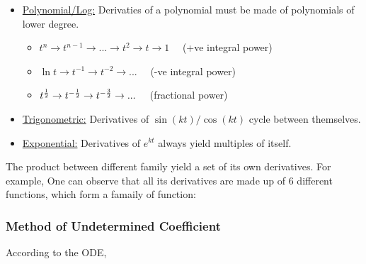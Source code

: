 \documentclass[class=article, crop=false, 12pt]{standalone}
\begin{document}
\begin{itemize}
    \item \ul{Polynomial/Log:} Derivaties of a polynomial must be made of polynomials of lower degree.
    \begin{itemize}
        \item $t^n \to t^{n-1} \to ...\to t^2 \to t \to 1 \quad$ (+ve integral power)
        \item $\ln t \to t^{-1} \to t^{-2} \to ... \quad$ (-ve integral power)
        \item $t^{\frac{1}{2}} \to t^{-\frac{1}{2}} \to t^{-\frac{3}{2}} \to ...\quad $ (fractional power)
    \end{itemize}

    \item \ul{Trigonometric:} Derivatives of $\sin{(kt)}/\cos{(kt)}$ cycle between themselves.
    
    \item \ul{Exponential:} Derivatives of $e^{kt}$ always yield multiples of itself.
\end{itemize}

The product between different family yield a set of its own derivatives. For example,
One can observe that all its derivatives are made up of 6 different functions,
which form a famaily of function:

\subsubsection{Method of Undetermined Coefficient}

According to the ODE,
\end{document}
